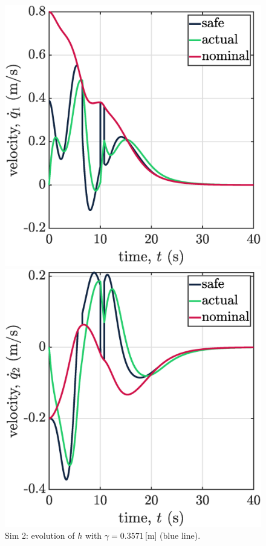 \begin{figure}[!ht]
\begin{minipage}[b]{0.46\linewidth}
    \caption{\label{fig:sim2h}Sim 2: evolution of $h$ with $\gamma = 0.3571\,[\mathrm{m}$] (blue line).}
    \end{minipage}
    \begin{minipage}[t]{.45\textwidth}
        \centering
        \includegraphics[width=\textwidth]{figures/sim2vel1.eps}
    \end{minipage}
    \hfill
    \begin{minipage}[t]{.45\textwidth}
        \centering
        \includegraphics[width=\textwidth]{figures/sim2vel2.eps}

\end{minipage}
\end{figure}

